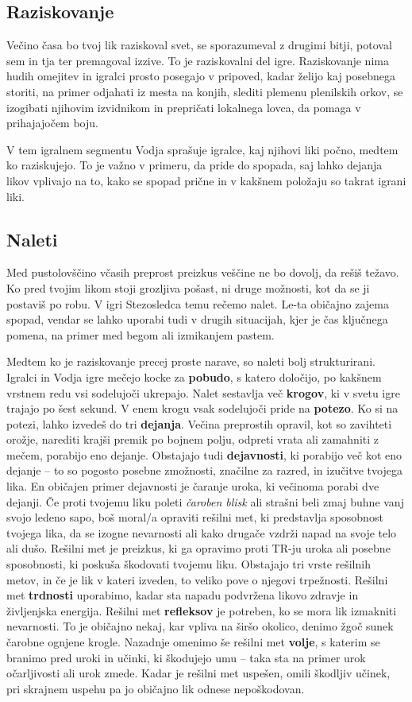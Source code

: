 \subsection{Raziskovanje}
Večino časa bo tvoj lik raziskoval svet, se sporazumeval z drugimi bitji, potoval sem in tja ter premagoval izzive. To je raziskovalni del igre. Raziskovanje nima hudih omejitev in igralci prosto posegajo v pripoved, kadar želijo kaj posebnega storiti, na primer odjahati iz mesta na konjih, slediti plemenu plenilskih orkov, se izogibati njihovim izvidnikom in prepričati lokalnega lovca, da pomaga v prihajajočem boju.

V tem igralnem segmentu Vodja sprašuje igralce, kaj njihovi liki počno, medtem ko raziskujejo. To je važno v primeru, da pride do spopada, saj lahko dejanja likov vplivajo na to, kako se spopad prične in v kakšnem položaju so takrat igrani liki.

\subsection{Naleti}
Med pustolovščino včasih preprost preizkus veščine ne bo dovolj, da rešiš težavo. Ko pred tvojim likom stoji grozljiva pošast, ni druge možnosti, kot da se ji postaviš po robu. V igri Stezosledca temu rečemo nalet. Le-ta običajno zajema spopad, vendar se lahko uporabi tudi v drugih situacijah, kjer je čas ključnega pomena, na primer med begom ali izmikanjem pastem.

Medtem ko je raziskovanje precej proste narave, so naleti bolj strukturirani. Igralci in Vodja igre mečejo kocke za \textbf{pobudo}, s katero določijo, po kakšnem vrstnem redu vsi sodelujoči ukrepajo. Nalet sestavlja več \textbf{krogov}, ki v svetu igre trajajo po šest sekund. V enem krogu vsak sodelujoči pride na \textbf{potezo}. Ko si na potezi, lahko izvedeš do tri \textbf{dejanja}. Večina preprostih opravil, kot so zavihteti orožje, narediti krajši premik po bojnem polju, odpreti vrata ali zamahniti z mečem, porabijo eno dejanje. Obstajajo tudi \textbf{dejavnosti}, ki porabijo več kot eno dejanje -- to so pogosto posebne zmožnosti, značilne za razred, in izučitve tvojega lika. En običajen primer dejavnosti je čaranje uroka, ki večinoma porabi dve dejanji.
Če proti tvojemu liku poleti \textit{čaroben blisk} ali strašni beli zmaj buhne vanj svojo ledeno sapo, boš moral/a opraviti rešilni met, ki predstavlja sposobnost tvojega lika, da se izogne nevarnosti ali kako drugače vzdrži napad na svoje telo ali dušo. Rešilni met je preizkus, ki ga opravimo proti TR-ju uroka ali posebne sposobnosti, ki poskuša škodovati tvojemu liku. Obstajajo tri vrste rešilnih metov, in če je lik v kateri izveden, to veliko pove o njegovi trpežnosti. Rešilni met \textbf{trdnosti} uporabimo, kadar sta napadu podvržena likovo zdravje in življenjska energija. Rešilni met \textbf{refleksov} je potreben, ko se mora lik izmakniti nevarnosti. To je običajno nekaj, kar vpliva na širšo okolico, denimo žgoč sunek čarobne ognjene krogle. Nazadnje omenimo še rešilni met \textbf{volje}, s katerim se branimo pred uroki in učinki, ki škodujejo umu -- taka sta na primer urok očarljivosti ali urok zmede. Kadar je rešilni met uspešen, omili škodljiv učinek, pri skrajnem uspehu pa jo običajno lik odnese nepoškodovan.

